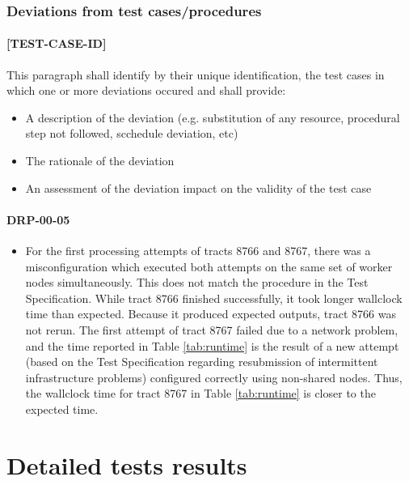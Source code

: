 \documentclass[DM,lsstdraft,STR,toc]{lsstdoc}
\begin{document}
\subsubsection{Deviations from test cases/procedures}
\paragraph{[TEST-CASE-ID]}
This paragraph shall identify by their unique identification, the test cases in which one or more deviations occured and shall provide:
\begin{itemize}
\item A description of the deviation (e.g. substitution of any resource, procedural step not followed, scchedule deviation, etc)
\item The rationale of the deviation
\item An assessment of the deviation impact on the validity of the test case
\end{itemize}

\paragraph{DRP-00-05}
\label{sec:deviation-drp-00-05}

\begin{itemize}
  \item{
    For the first processing attempts of tracts 8766 and 8767, there was a misconfiguration which executed both attempts on the same set of worker nodes simultaneously.
    This does not match the procedure in the Test Specification.
    While tract 8766 finished successfully, it took longer wallclock time than expected.
    Because it produced expected outputs, tract 8766 was not rerun.
    The first attempt of tract 8767 failed due to a network problem, and the time reported in Table \ref{tab:runtime} is the result of a new attempt (based on the Test Specification regarding resubmission of intermittent infrastructure problems) configured correctly using non-shared nodes.
    Thus, the wallclock time for tract 8767 in Table \ref{tab:runtime} is closer to the expected
	time.
  }
\end{itemize}

\appendix

\newpage
\section{Detailed tests results \label{sect:results}}






\end{document}
